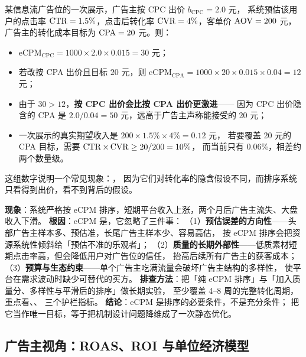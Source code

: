 \begin{example}[一次具体的换算]
某信息流广告位的一次展示，广告主按 CPC 出价 $b_{\text{CPC}} = 2.0$ 元，
系统预估该用户的点击率 $\operatorname{CTR} = 1.5\%$，点击后转化率 $\operatorname{CVR} = 4\%$，客单价 $\operatorname{AOV} = 200$ 元，
广告主的转化成本目标为 $\operatorname{CPA} = 20$ 元。则：
\begin{itemize}
  \item $\text{eCPM}_{\text{CPC}} = 1000 \times 2.0 \times 0.015 = 30$ 元；
  \item 若改按 CPA 出价且目标 $20$ 元，则 $\text{eCPM}_{\text{CPA}} = 1000 \times 20 \times 0.015 \times 0.04 = 12$ 元；
  \item 由于 $30 > 12$，\textbf{按 CPC 出价会比按 CPA 出价更激进}——
        因为 CPC 出价隐含的 CPA 是 $2.0 / 0.04 = 50$ 元，远高于广告主声称能接受的 20 元；
  \item 一次展示的真实期望收入是 $200 \times 1.5\% \times 4\% = 0.12$ 元，
        若要覆盖 20 元的 CPA 目标，需要 $\operatorname{CTR} \times \operatorname{CVR} \ge 20/200 = 10\%$，
        而当前只有 $0.06\%$，相差约两个数量级。
\end{itemize}
这组数字说明一个常见现象：，
因为它们对转化率的隐含假设不同，而排序系统只看得到出价，看不到背后的假设。
\end{example}

\begin{pitfall}
\textbf{现象}：系统严格按 eCPM 排序，短期平台收入上涨，两个月后广告主流失、大盘收入下滑。
\textbf{根因}：eCPM 是，它忽略了三件事：
（1）\textbf{预估误差的方向性}——头部广告主样本多、预估准，长尾广告主样本少、容易高估，
按 eCPM 排序会把资源系统性倾斜给「预估不准的乐观者」；
（2）\textbf{质量的长期外部性}——低质素材短期点击率高，但会降低用户对广告位的信任，
抬高后续所有广告主的获客成本；
（3）\textbf{预算与生态约束}——单个广告主吃满流量会破坏广告主结构的多样性，
使平台在需求波动时缺少可替代的买方。
\textbf{排查方法}：把「纯 eCPM 排序」与「加入质量分、多样性与平滑后的排序」做长期实验，
至少覆盖 4--8 周的完整转化周期，重点看、、
三个护栏指标。
\textbf{结论}：eCPM 是排序的必要条件，不是充分条件；
把它当作唯一目标，等于把机制设计问题降维成了一次静态优化。
\end{pitfall}

\subsection{广告主视角：ROAS、ROI 与单位经济模型}


